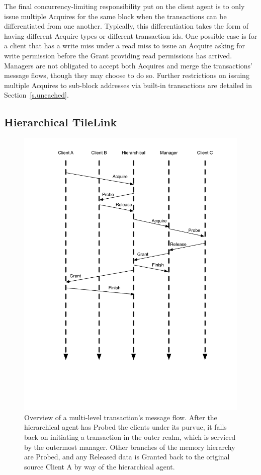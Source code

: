 The final concurrency-limiting responsibility put on the client agent is to only issue multiple Acquires for the same block when the transactions can be differentiated from one another.
Typically, this differentiation takes the form of having different Acquire types or different transaction ids.
One possible case is for a client that has a write miss under a read miss to issue an Acquire asking for write permission before the Grant providing read permissions has arrived.
Managers are not obligated to accept both Acquires and merge the transactions' message flows, though they may choose to do so.
Further restrictions on issuing multiple Acquires to sub-block addresses via built-in transactions are detailed in Section~\ref{s.uncached}.


\subsection{Hierarchical TileLink}

\begin{figure}[p]
\centering
\includegraphics[width=0.8\columnwidth]{tilelink/figures/standard5.pdf}
\caption{Overview of a multi-level transaction's message flow.
After the hierarchical agent has Probed the clients under its purvue, it falls back on initiating a transaction in the outer realm,
which is serviced by the outermost manager. Other branches of the memory hierarchy are Probed,
and any Released data is Granted back to the original source Client A by way of the hierarchical agent.
}
\label{fig:standard5}
\end{figure}

